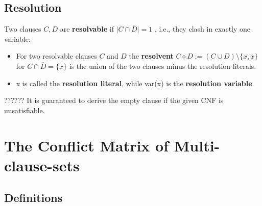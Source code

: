 \documentclass[12pt]{book}
\begin{document}
\section{Resolution}
\label{sec:Resolution}

\begin{defi}\label{def:Resolution}
 Two clauses $C,D$ are \textbf{resolvable} if $\mid C \cap \overline D \mid = 1$ , i.e., they clash in exactly one variable:
\begin{itemize}
 \item For two resolvable clauses $C$ and $D$ the \textbf{resolvent} $C \diamond D := (C \cup D) \setminus \{x, \overline x\} $ for $C \cap \overline D = \{ x \}$ 
 is the union of the two clauses minus the resolution literals.
 \item x is called the \textbf{resolution literal}, while var(x) is the \textbf{resolution variable}.
 \end{itemize}
 \end{defi}
 
 ??????
 It is guaranteed to derive the empty clause if the given CNF is unsatisfiable.

\chapter{The Conflict Matrix of Multi-clause-sets}
\label{cha:The Conflict Matrix of Multi-clause-sets}
\section{Definitions}
\label{sec:Definitions}

\end{document}
